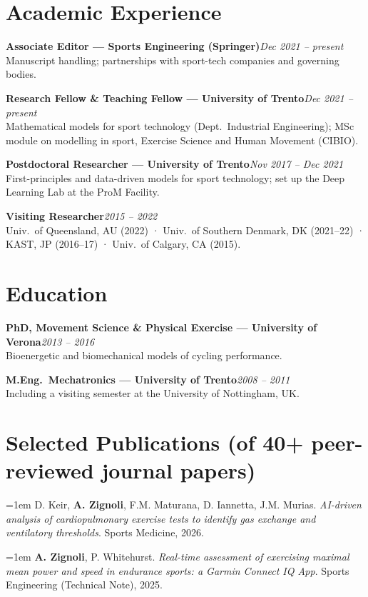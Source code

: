 \documentclass[10pt,a4paper]{article}
\newcommand{\entry}[3]{%
  \textbf{#2}\hfill\textit{\small#1}\\[1pt]
  \small#3\par\vspace{5pt}%
}
\newcommand{\pub}[3]{%
  \hangindent=1em\hangafter=1
  \small #1. \textit{#2}. #3.\par\vspace{3pt}%
}
\begin{document}
\section{Academic Experience}

\entry{Dec 2021 – present}{Associate Editor — Sports Engineering (Springer)}{Manuscript handling; partnerships with sport-tech companies and governing bodies.}
\entry{Dec 2021 – present}{Research Fellow \& Teaching Fellow — University of Trento}{Mathematical models for sport technology (Dept.\ Industrial Engineering); MSc module on modelling in sport, Exercise Science and Human Movement (CIBIO).}
\entry{Nov 2017 – Dec 2021}{Postdoctoral Researcher — University of Trento}{First-principles and data-driven models for sport technology; set up the Deep Learning Lab at the ProM Facility.}
\entry{2015 – 2022}{Visiting Researcher}{Univ.\ of Queensland, AU (2022) · Univ.\ of Southern Denmark, DK (2021--22) · KAST, JP (2016--17) · Univ.\ of Calgary, CA (2015).}

\section{Education}

\entry{2013 – 2016}{PhD, Movement Science \& Physical Exercise — University of Verona}{Bioenergetic and biomechanical models of cycling performance.}
\entry{2008 – 2011}{M.Eng.\ Mechatronics — University of Trento}{Including a visiting semester at the University of Nottingham, UK.}

\section{Selected Publications (of 40+ peer-reviewed journal papers)}

\pub{D. Keir, \textbf{A. Zignoli}, F.M. Maturana, D. Iannetta, J.M. Murias}{AI-driven analysis of cardiopulmonary exercise tests to identify gas exchange and ventilatory thresholds}{Sports Medicine, 2026}

\pub{\textbf{A. Zignoli}, P. Whitehurst}{Real-time assessment of exercising maximal mean power and speed in endurance sports: a Garmin Connect IQ App}{Sports Engineering (Technical Note), 2025}
\end{document}
